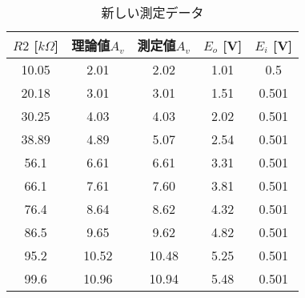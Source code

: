 \documentclass[a4paper,11pt,xelatex,ja=standard]{bxjsarticle}
\begin{document}
        \begin{table}[htbp]
            \centering
            \caption{新しい測定データ}
            \begin{tabular}{|c|c|c|c|c|}
                \hline
                $R2$ [$k\Omega$] & 理論値$A_v$ & 測定値$A_v$ & $E_o$ [V] & $E_i$ [V] \\
                \hline
                10.05 & 2.01 & 2.02 & 1.01 & 0.5 \\
                20.18 & 3.01 & 3.01 & 1.51 & 0.501 \\
                30.25 & 4.03 & 4.03 & 2.02 & 0.501 \\
                38.89 & 4.89 & 5.07 & 2.54 & 0.501 \\
                56.1  & 6.61 & 6.61 & 3.31 & 0.501 \\
                66.1  & 7.61 & 7.60 & 3.81 & 0.501 \\
                76.4  & 8.64 & 8.62 & 4.32 & 0.501 \\
                86.5  & 9.65 & 9.62 & 4.82 & 0.501 \\
                95.2  & 10.52 & 10.48 & 5.25 & 0.501 \\
                99.6  & 10.96 & 10.94 & 5.48 & 0.501 \\
                \hline
            \end{tabular}
            \label{tab:newdata}
        \end{table}
\end{document}
